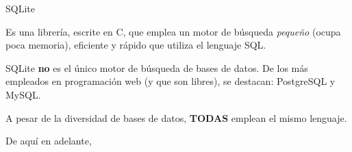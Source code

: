 \begin{frame}[t]{SQLite}\vspace{10pt}

Es una librería, escrite en C, que emplea un motor de búsqueda \textit{peque\~no} (ocupa poca memoria), eficiente y rápido que utiliza el lenguaje SQL. 

\vspace{5pt}

SQLite \textbf{no} es el único motor de búsqueda de bases de datos. De los más empleados en programación web (y que son libres), se destacan: PostgreSQL y MySQL. 

\vspace{5pt}

A pesar de la diversidad de bases de datos, \textbf{TODAS} emplean el mismo lenguaje.

\vspace{5pt}

De aquí en adelante, 

\end{frame}